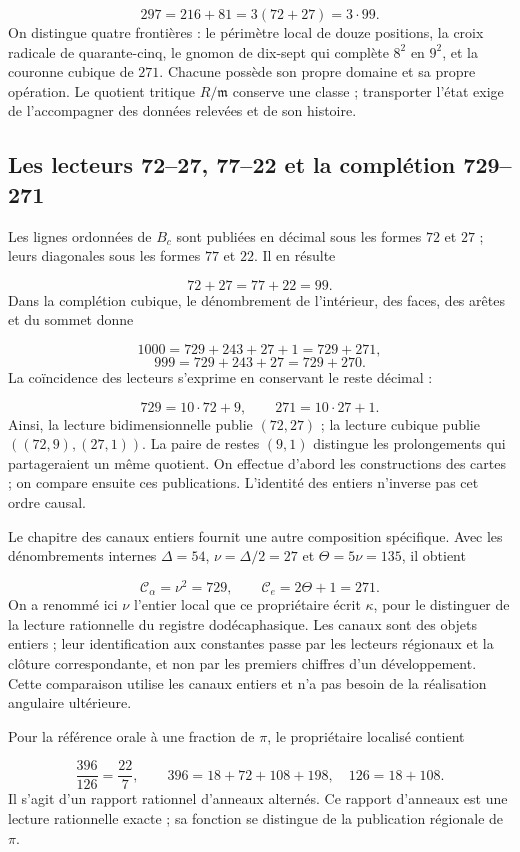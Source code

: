\[
297=216+81=3(72+27)=3\cdot99.
\]
On distingue quatre frontières : le périmètre local de douze positions, la croix radicale de quarante-cinq, le gnomon de dix-sept qui complète \(8^2\) en \(9^2\), et la couronne cubique de \(271\). Chacune possède son propre domaine et sa propre opération. Le quotient tritique \(R/\mathfrak m\) conserve une classe ; transporter l'état exige de l'accompagner des données relevées et de son histoire.

\subsection{Les lecteurs 72–27, 77–22 et la complétion 729–271}
Les lignes ordonnées de \(B_c\) sont publiées en décimal sous les formes \(72\) et \(27\) ; leurs diagonales sous les formes \(77\) et \(22\). Il en résulte

\[
72+27=77+22=99.
\]
Dans la complétion cubique, le dénombrement de l'intérieur, des faces, des arêtes et du sommet donne

\[
1000=729+243+27+1=729+271,
\]
\[
999=729+243+27=729+270.
\]
La coïncidence des lecteurs s'exprime en conservant le reste décimal :

\[
729=10\cdot72+9,\qquad271=10\cdot27+1.
\]
Ainsi, la lecture bidimensionnelle publie \((72,27)\) ; la lecture cubique publie \(((72,9),(27,1))\). La paire de restes \((9,1)\) distingue les prolongements qui partageraient un même quotient. On effectue d'abord les constructions des cartes ; on compare ensuite ces publications. L'identité des entiers n'inverse pas cet ordre causal.

Le chapitre des canaux entiers fournit une autre composition spécifique. Avec les dénombrements internes \(\Delta=54\), \(\nu=\Delta/2=27\) et \(\Theta=5\nu=135\), il obtient

\[
\mathcal C_\alpha=\nu^2=729,
\qquad \mathcal C_e=2\Theta+1=271.
\]
On a renommé ici \(\nu\) l'entier local que ce propriétaire écrit \(\kappa\), pour le distinguer de la lecture rationnelle du registre dodécaphasique. Les canaux sont des objets entiers ; leur identification aux constantes passe par les lecteurs régionaux et la clôture correspondante, et non par les premiers chiffres d'un développement. Cette comparaison utilise les canaux entiers et n'a pas besoin de la réalisation angulaire ultérieure.

Pour la référence orale à une fraction de \(\pi\), le propriétaire localisé contient

\[
\frac{396}{126}=\frac{22}{7},\qquad
396=18+72+108+198,\quad126=18+108.
\]
Il s'agit d'un rapport rationnel d'anneaux alternés. Ce rapport d'anneaux est une lecture rationnelle exacte ; sa fonction se distingue de la publication régionale de \(\pi\).

